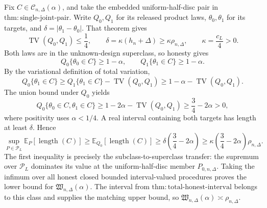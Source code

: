Fix \(C\in\mathcal C_{n,\Delta}(\alpha)\), and take the embedded uniform-half-disc pair in \(\mathrm{thm:single\text{-}joint\text{-}pair}\).  Write \(Q_0,Q_1\) for its released product laws, \(\theta_0,\theta_1\) for its targets, and \(\delta=|\theta_1-\theta_0|\).  That theorem gives
\[
 \operatorname{TV}(Q_0,Q_1)\leq\frac14,
 \qquad
 \delta=\kappa(h_n+\Delta)\geq\kappa\rho_{n,\Delta},
 \qquad \kappa=\frac{c_L}{4}>0.
\]
Both laws are in the unknown-design superclass, so honesty gives
\[
 Q_0\{\theta_0\in C\}\geq1-\alpha,
 \qquad
 Q_1\{\theta_1\in C\}\geq1-\alpha.
\]
By the variational definition of total variation,
\[
 Q_0\{\theta_1\in C\}
 \geq Q_1\{\theta_1\in C\}-\operatorname{TV}(Q_0,Q_1)
 \geq1-\alpha-\operatorname{TV}(Q_0,Q_1).
\]
The union bound under \(Q_0\) yields
\[
 Q_0\{\theta_0\in C,\theta_1\in C\}
 \geq1-2\alpha-\operatorname{TV}(Q_0,Q_1)
 \geq\frac34-2\alpha>0,
\]
where positivity uses \(\alpha<1/4\).  A real interval containing both targets has length at least \(\delta\).  Hence
\[
 \sup_{P\in\mathcal P_L}\mathbb E_P[\operatorname{length}(C)]
 \geq\mathbb E_{Q_0}[\operatorname{length}(C)]
 \geq\delta\left(\frac34-2\alpha\right)
 \geq\kappa\left(\frac34-2\alpha\right)\rho_{n,\Delta}.
\]
The first inequality is precisely the subclass-to-superclass transfer: the supremum over \(\mathcal P_L\) dominates its value at the uniform-half-disc member \(P_{0,n,\Delta}\).  Taking the infimum over all honest closed bounded interval-valued procedures proves the lower bound for \(\mathfrak W_{n,\Delta}(\alpha)\).  The interval from \(\mathrm{thm:total\text{-}honest\text{-}interval}\) belongs to this class and supplies the matching upper bound, so \(\mathfrak W_{n,\Delta}(\alpha)\asymp\rho_{n,\Delta}\).